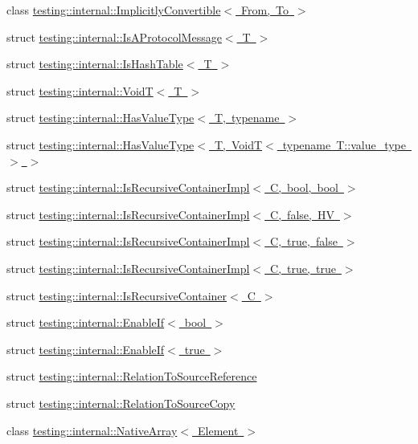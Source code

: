\begin{DoxyCompactItemize}
\item 
class \mbox{\hyperlink{classtesting_1_1internal_1_1ImplicitlyConvertible}{testing\+::internal\+::\+Implicitly\+Convertible$<$ From, To $>$}}
\item 
struct \mbox{\hyperlink{structtesting_1_1internal_1_1IsAProtocolMessage}{testing\+::internal\+::\+Is\+A\+Protocol\+Message$<$ T $>$}}
\item 
struct \mbox{\hyperlink{structtesting_1_1internal_1_1IsHashTable}{testing\+::internal\+::\+Is\+Hash\+Table$<$ T $>$}}
\item 
struct \mbox{\hyperlink{structtesting_1_1internal_1_1VoidT}{testing\+::internal\+::\+Void\+T$<$ T $>$}}
\item 
struct \mbox{\hyperlink{structtesting_1_1internal_1_1HasValueType}{testing\+::internal\+::\+Has\+Value\+Type$<$ T, typename $>$}}
\item 
struct \mbox{\hyperlink{structtesting_1_1internal_1_1HasValueType_3_01T_00_01VoidT_3_01typename_01T_1_1value__type_01_4_01_4}{testing\+::internal\+::\+Has\+Value\+Type$<$ T, Void\+T$<$ typename T\+::value\+\_\+type $>$ $>$}}
\item 
struct \mbox{\hyperlink{structtesting_1_1internal_1_1IsRecursiveContainerImpl}{testing\+::internal\+::\+Is\+Recursive\+Container\+Impl$<$ C, bool, bool $>$}}
\item 
struct \mbox{\hyperlink{structtesting_1_1internal_1_1IsRecursiveContainerImpl_3_01C_00_01false_00_01HV_01_4}{testing\+::internal\+::\+Is\+Recursive\+Container\+Impl$<$ C, false, H\+V $>$}}
\item 
struct \mbox{\hyperlink{structtesting_1_1internal_1_1IsRecursiveContainerImpl_3_01C_00_01true_00_01false_01_4}{testing\+::internal\+::\+Is\+Recursive\+Container\+Impl$<$ C, true, false $>$}}
\item 
struct \mbox{\hyperlink{structtesting_1_1internal_1_1IsRecursiveContainerImpl_3_01C_00_01true_00_01true_01_4}{testing\+::internal\+::\+Is\+Recursive\+Container\+Impl$<$ C, true, true $>$}}
\item 
struct \mbox{\hyperlink{structtesting_1_1internal_1_1IsRecursiveContainer}{testing\+::internal\+::\+Is\+Recursive\+Container$<$ C $>$}}
\item 
struct \mbox{\hyperlink{structtesting_1_1internal_1_1EnableIf}{testing\+::internal\+::\+Enable\+If$<$ bool $>$}}
\item 
struct \mbox{\hyperlink{structtesting_1_1internal_1_1EnableIf_3_01true_01_4}{testing\+::internal\+::\+Enable\+If$<$ true $>$}}
\item 
struct \mbox{\hyperlink{structtesting_1_1internal_1_1RelationToSourceReference}{testing\+::internal\+::\+Relation\+To\+Source\+Reference}}
\item 
struct \mbox{\hyperlink{structtesting_1_1internal_1_1RelationToSourceCopy}{testing\+::internal\+::\+Relation\+To\+Source\+Copy}}
\item 
class \mbox{\hyperlink{classtesting_1_1internal_1_1NativeArray}{testing\+::internal\+::\+Native\+Array$<$ Element $>$}}
\end{DoxyCompactItemize}
